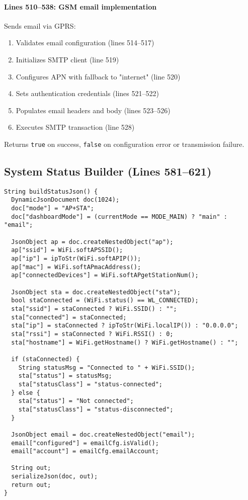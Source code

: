 \documentclass[11pt,a4paper]{article}
\begin{document}
\paragraph{Lines 510--538: GSM email implementation}
Sends email via GPRS:
\begin{enumerate}[leftmargin=*]
  \item Validates email configuration (lines 514--517)
  \item Initializes SMTP client (line 519)
  \item Configures APN with fallback to "internet" (line 520)
  \item Sets authentication credentials (lines 521--522)
  \item Populates email headers and body (lines 523--526)
  \item Executes SMTP transaction (line 528)
\end{enumerate}

Returns \texttt{true} on success, \texttt{false} on configuration error or transmission failure.

\subsection{System Status Builder (Lines 581--621)}

\begin{verbatim}
String buildStatusJson() {
  DynamicJsonDocument doc(1024);
  doc["mode"] = "AP+STA";
  doc["dashboardMode"] = (currentMode == MODE_MAIN) ? "main" : "email";

  JsonObject ap = doc.createNestedObject("ap");
  ap["ssid"] = WiFi.softAPSSID();
  ap["ip"] = ipToStr(WiFi.softAPIP());
  ap["mac"] = WiFi.softAPmacAddress();
  ap["connectedDevices"] = WiFi.softAPgetStationNum();

  JsonObject sta = doc.createNestedObject("sta");
  bool staConnected = (WiFi.status() == WL_CONNECTED);
  sta["ssid"] = staConnected ? WiFi.SSID() : "";
  sta["connected"] = staConnected;
  sta["ip"] = staConnected ? ipToStr(WiFi.localIP()) : "0.0.0.0";
  sta["rssi"] = staConnected ? WiFi.RSSI() : 0;
  sta["hostname"] = WiFi.getHostname() ? WiFi.getHostname() : "";

  if (staConnected) {
    String statusMsg = "Connected to " + WiFi.SSID();
    sta["status"] = statusMsg;
    sta["statusClass"] = "status-connected";
  } else {
    sta["status"] = "Not connected";
    sta["statusClass"] = "status-disconnected";
  }

  JsonObject email = doc.createNestedObject("email");
  email["configured"] = emailCfg.isValid();
  email["account"] = emailCfg.emailAccount;

  String out;
  serializeJson(doc, out);
  return out;
}
\end{verbatim}
\end{document}
